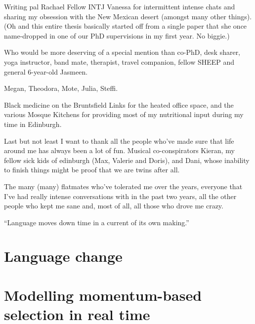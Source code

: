 \documentclass[oneside]{book}
\begin{document}
Writing pal Rachael
Fellow INTJ Vanessa for intermittent intense chats and sharing my obsession with the New Mexican desert (amongst many other things). (Oh and this entire thesis basically started off from a single paper that she once name-dropped in one of our PhD supervisions in my first year. No biggie.)

Who would be more deserving of a special mention than co-PhD, desk sharer, yoga instructor, band mate, therapist, travel companion, fellow SHEEP and general 6-year-old Jasmeen.

Megan, Theodora, Mote, Julia, Steffi.

Black medicine on the Bruntsfield Links for the heated office space, and the various Mosque Kitchens for providing most of my nutritional input during my time in Edinburgh.

Last but not least I want to thank all the people who've made sure that life around me has always been a lot of fun. Musical co-conspirators Kieran, my fellow sick kids of edinburgh (Max, Valerie and Doris), and Dani, whose inability to finish things might be proof that we are twins after all.

The many (many) flatmates who've tolerated me over the years, everyone that I've had really intense conversations with in the past two years, all the other people who kept me sane and, most of all, all those who drove me crazy.

\newpage
\thispagestyle{empty}
\epigraph{``Language moves down time in a current of its own making.''}{\citep[p.160]{Sapir1921}}



\chapter{Language change}
\label{ch:review}


\chapter[Momentum-based selection in real time]{Modelling momentum-based selection in real time}
\label{ch:model1}

\end{document}

